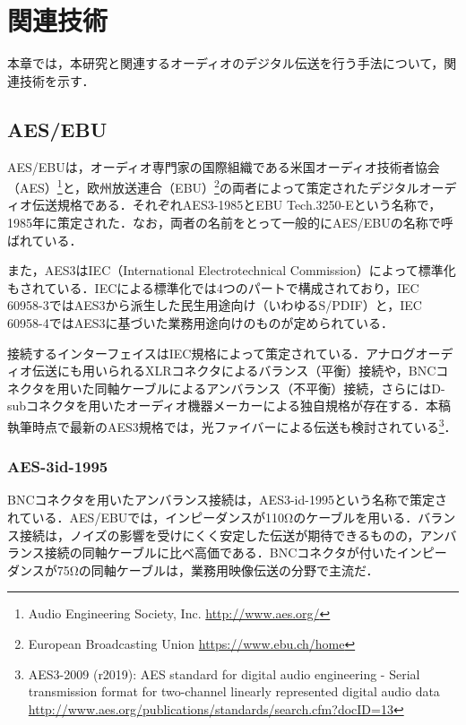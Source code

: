 \chapter{関連技術}
\label{chap:related_works}

本章では，本研究と関連するオーディオのデジタル伝送を行う手法について，関連技術を示す．

\section{AES/EBU}

AES/EBUは，オーディオ専門家の国際組織である米国オーディオ技術者協会（AES）\footnote{Audio Engineering Society, Inc. \url{http://www.aes.org/}}と，欧州放送連合（EBU）\footnote{European Broadcasting Union \url{https://www.ebu.ch/home}}の両者によって策定されたデジタルオーディオ伝送規格である．それぞれAES3-1985\cite{aes3-1985}とEBU Tech.3250-E\cite{ebutech-3250-e}という名称で，1985年に策定された．なお，両者の名前をとって一般的にAES/EBUの名称で呼ばれている．

また，AES3はIEC（International Electrotechnical Commission）によって標準化もされている．IECによる標準化では4つのパートで構成されており，IEC 60958-3ではAES3から派生した民生用途向け（いわゆるS/PDIF）と，IEC 60958-4ではAES3に基づいた業務用途向けのものが定められている．

接続するインターフェイスはIEC規格によって策定されている．アナログオーディオ伝送にも用いられるXLRコネクタによるバランス（平衡）接続や，BNCコネクタを用いた同軸ケーブルによるアンバランス（不平衡）接続，さらにはD-subコネクタを用いたオーディオ機器メーカーによる独自規格が存在する．本稿執筆時点で最新のAES3規格では，光ファイバーによる伝送も検討されている\footnote{AES3-2009 (r2019): AES standard for digital audio engineering - Serial transmission format for two-channel linearly represented digital audio data \url{http://www.aes.org/publications/standards/search.cfm?docID=13}}．

\subsection{AES-3id-1995}

BNCコネクタを用いたアンバランス接続は，AES3-id-1995という名称で策定されている．AES/EBUでは，インピーダンスが110Ωのケーブルを用いる．バランス接続は，ノイズの影響を受けにくく安定した伝送が期待できるものの，アンバランス接続の同軸ケーブルに比べ高価である．BNCコネクタが付いたインピーダンスが75Ωの同軸ケーブルは，業務用映像伝送の分野で主流だ．

